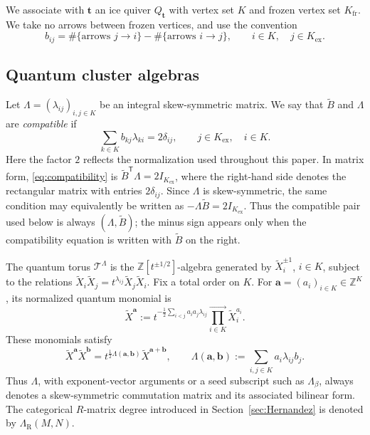 \documentclass[12pt, reqno]{amsart}
\theoremstyle{plain}
\theoremstyle{definition}
\numberwithin{equation}{section}
\newcommand{\ZZ}{\mathbb{Z}}
\newcommand{\LambdaR}{\Lambda_{\mathrm R}}
\begin{document}
We associate with \(\mathbf t\) an ice quiver \(Q_{\mathbf t}\) with vertex
set \(K\) and frozen vertex set \(K_{\mathrm{fr}}\). We take no arrows
between frozen vertices, and use the convention
\begin{equation}\label{eq:quiver-convention}   b_{ij}
    =\#\{\text{arrows }j\to i\}
     -\#\{\text{arrows }i\to j\},
    \qquad i\in K,\quad j\in K_{\mathrm{ex}}.
\end{equation}

\subsection{Quantum cluster algebras}

Let \(\Lambda=(\lambda_{ij})_{i,j\in K}\) be an integral
skew-symmetric matrix. We say that \(\widetilde B\) and \(\Lambda\) are
\emph{compatible} if
\begin{equation}\label{eq:compatibility}
    \sum_{k\in K}b_{kj}\lambda_{ki}=2\delta_{ij},
    \qquad j\in K_{\mathrm{ex}},\quad i\in K.
\end{equation}
Here the factor \(2\) reflects the normalization used throughout this paper.
In matrix form, \eqref{eq:compatibility} is
\(\widetilde B^{\mathsf T}\Lambda=2I_{K_{\mathrm{ex}}}\), where the
right-hand side denotes the rectangular matrix with entries
\(2\delta_{ij}\). Since \(\Lambda\) is skew-symmetric, the same condition
may equivalently be written as
\(-\Lambda\widetilde B=2I_{K_{\mathrm{ex}}}\). Thus the compatible pair
used below is always \((\Lambda,\widetilde B)\); the minus sign appears only
when the compatibility equation is written with \(\widetilde B\) on the
right.

The quantum torus \(\mathcal T^\Lambda\) is the
\(\ZZ[t^{\pm1/2}]\)-algebra generated by
\(\widetilde X_i^{\pm1}\), \(i\in K\), subject to the relations
\(\widetilde X_i\widetilde X_j
=t^{\lambda_{ij}}\widetilde X_j\widetilde X_i\). Fix a total order on
\(K\). For \(\mathbf a=(a_i)_{i\in K}\in\ZZ^K\), its normalized
quantum monomial is
\begin{equation}\label{eq:quantum-monomial}
    \widetilde X^{\mathbf a}
    :=t^{-\frac12\sum_{i<j}a_i a_j\lambda_{ij}}
      \prod_{i\in K}^{\longrightarrow}\widetilde X_i^{a_i}.
\end{equation}
These monomials satisfy
\begin{equation}\label{eq:quantum-monomial-product}
    \widetilde X^{\mathbf a}\widetilde X^{\mathbf b}
    =t^{\frac12\Lambda(\mathbf a,\mathbf b)}
      \widetilde X^{\mathbf a+\mathbf b},
    \qquad
    \Lambda(\mathbf a,\mathbf b)
    :=\sum_{i,j\in K}a_i\lambda_{ij}b_j.
\end{equation}
Thus \(\Lambda\), with exponent-vector arguments or a seed
subscript such as \(\Lambda_\beta\), always denotes a
skew-symmetric commutation matrix and its associated bilinear form.
The categorical \(R\)-matrix degree introduced in
Section~\ref{sec:Hernandez} is denoted by \(\LambdaR(M,N)\).
\end{document}
